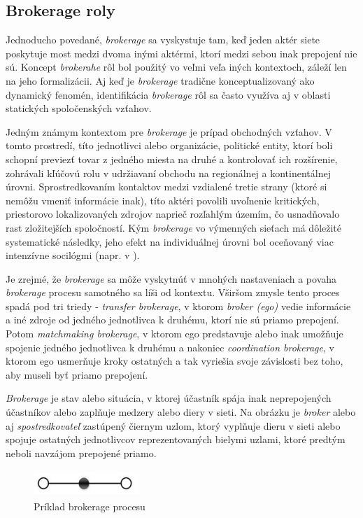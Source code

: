 \documentclass[slovak,master,public,dept460,male,cpdeclaration,oneside]{diploma}
\begin{document}
\subsection{Brokerage roly}
Jednoducho povedané, \textit{brokerage} sa vyskystuje tam, keď jeden aktér siete poskytuje most medzi dvoma inými aktérmi, ktorí medzi sebou inak prepojení nie sú. Koncept \textit{brokerahe} rôl bol použitý vo veľmi veľa iných kontextoch, záleží len na jeho formalizácii. Aj keď je \textit{brokerage} tradične konceptualizovaný ako dynamický fenomén, identifikácia \textit{brokerage} rôl sa často využíva aj v oblasti statických spoločenských vzťahov. 


Jedným známym kontextom pre \textit{brokerage} je prípad obchodných vzťahov. V tomto prostredí, títo jednotlivci alebo organizácie, politické entity, ktorí boli schopní previezť tovar z jedného miesta na druhé a kontrolovať ich rozšírenie, zohrávali kľúčovú rolu v udržiavaní obchodu na regionálnej a kontinentálnej úrovni. Sprostredkovaním kontaktov medzi vzdialené tretie strany (ktoré si nemôžu vmeniť informácie inak), títo aktéri povolili uvoľnenie kritických, priestorovo lokalizovaných zdrojov naprieč rozľahlým územím, čo usnadňovalo rast zložitejších spoločností.  Kým \textit{brokerage} vo výmenných sieťach má dôležité systematické následky, jeho efekt na individuálnej úrovni bol oceňovaný viac intenzívne socilógmi (napr. v \cite{15} \cite{17} \cite{18}). 


Je zrejmé, že \textit{brokerage} sa môže vyskytnúť v mnohých nastaveniach a povaha \textit{brokerage} procesu samotného sa líši od kontextu. Vširšom zmysle tento proces spadá pod tri triedy - \textit{transfer brokerage}, v ktorom \textit{broker (ego)} vedie informácie a iné zdroje od jedného jednotlivca k druhému, ktorí nie sú priamo prepojení. Potom \textit{matchmaking brokerage}, v ktorom ego predstavuje alebo inak umožňuje spojenie jedného jednotlivca k druhému a nakoniec \textit{coordination brokerage}, v ktorom ego usmerňuje kroky ostatných a tak vyriešia svoje závislosti bez toho, aby museli byť priamo prepojení.


\textit{Brokerage} je stav alebo situácia, v ktorej účastník spája inak neprepojených účastníkov alebo zaplňuje medzery alebo diery v sieti. \cite{15} Na obrázku je \textit{broker} alebo aj \textit{spostredkovateľ} zastúpený čiernym uzlom, ktorý vyplňuje dieru v sieti alebo spojuje ostatných jednotlivcov reprezentovaných bielymi uzlami, ktoré predtým neboli navzájom prepojené priamo.

\begin{figure}[H]
\centering
\includegraphics[width=4cm, height=1cm]{figures/brokerage_example}
\caption{Príklad brokerage procesu}
\end{figure}
\end{document}

